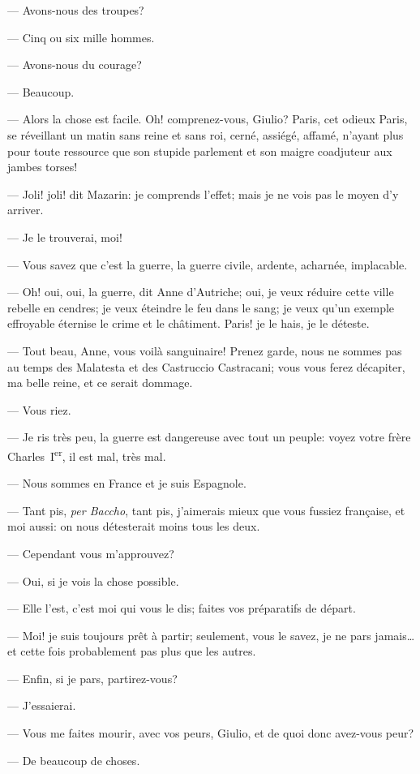 — Avons-nous des troupes?

— Cinq ou six mille hommes.

— Avons-nous du courage?

— Beaucoup.

— Alors la chose est facile. Oh! comprenez-vous, Giulio? Paris, cet odieux Paris, se réveillant un matin sans reine et sans roi, cerné, assiégé, affamé, n'ayant plus pour toute ressource que son stupide parlement et son maigre coadjuteur aux jambes torses!

— Joli! joli! dit Mazarin: je comprends l'effet; mais je ne vois pas le moyen d'y arriver.

— Je le trouverai, moi!

— Vous savez que c'est la guerre, la guerre civile, ardente, acharnée, implacable.

— Oh! oui, oui, la guerre, dit Anne d'Autriche; oui, je veux réduire cette ville rebelle en cendres; je veux éteindre le feu dans le sang; je veux qu'un exemple effroyable éternise le crime et le châtiment. Paris! je le hais, je le déteste.

— Tout beau, Anne, vous voilà sanguinaire! Prenez garde, nous ne sommes pas au temps des Malatesta et des Castruccio Castracani; vous vous ferez décapiter, ma belle reine, et ce serait dommage.

— Vous riez.

— Je ris très peu, la guerre est dangereuse avec tout un peuple: voyez votre frère Charles~I\textsuperscript{er}, il est mal, très mal.

— Nous sommes en France et je suis Espagnole.

— Tant pis, \textit{per Baccho}, tant pis, j'aimerais mieux que vous fussiez française, et moi aussi: on nous détesterait moins tous les deux.

— Cependant vous m'approuvez?

— Oui, si je vois la chose possible.

— Elle l'est, c'est moi qui vous le dis; faites vos préparatifs de départ.

— Moi! je suis toujours prêt à partir; seulement, vous le savez, je ne pars jamais\dots et cette fois probablement pas plus que les autres.

— Enfin, si je pars, partirez-vous?

— J'essaierai.

— Vous me faites mourir, avec vos peurs, Giulio, et de quoi donc avez-vous peur?

— De beaucoup de choses.

